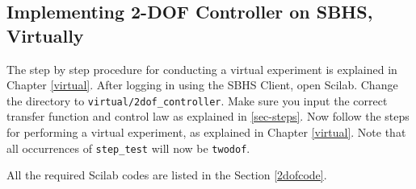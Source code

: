 \subsection{Implementing 2-DOF Controller on SBHS, Virtually}
The step by step procedure for conducting a virtual experiment is explained in Chapter \ref{virtual}. After logging in using the SBHS Client, open Scilab. Change the directory to {\tt virtual/2dof\_controller}.
Make sure you input the correct transfer function and control law as explained in \ref{sec-steps}. Now follow the steps for performing a virtual experiment, as explained in Chapter \ref{virtual}. Note that all occurrences of {\tt step\_test} will now be {\tt twodof}.

 All the required Scilab codes are listed in the Section \ref{2dofcode}.

